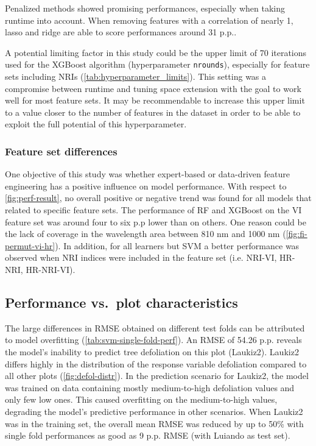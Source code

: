 \documentclass[final]{IEEEtran}
\begin{document}
Penalized methods showed promising performances, especially when taking runtime into account.
When removing features with a correlation of nearly 1, lasso and ridge are able to score performances around 31 p.p..

A potential limiting factor in this study could be the upper limit of 70 iterations used for the XGBoost algorithm (hyperparameter \texttt{nrounds}), especially for feature sets including NRIs (\autoref{tab:hyperparameter_limits}).
This setting was a compromise between runtime and tuning space extension with the goal to work well for most feature sets.
It may be recommendable to increase this upper limit to a value closer to the number of features in the dataset in order to be able to exploit the full potential of this hyperparameter.

\subsubsection{Feature set differences}

One objective of this study was whether expert-based or data-driven feature engineering has a positive influence on model performance.
With respect to \autoref{fig:perf-result}, no overall positive or negative trend was found for all models that related to specific feature sets.
The performance of RF and XGBoost on the VI feature set was around four to six p.p lower than on others.
One reason could be the lack of coverage in the wavelength area between 810 nm and 1000 nm (\autoref{fig:fi-permut-vi-hr}).
In addition, for all learners but SVM a better performance was observed when NRI indices were included in the feature set (i.e. NRI-VI, HR-NRI, HR-NRI-VI).

\subsection{Performance vs.\ plot characteristics}
\label{subsec:perf-plot-char}

The large differences in RMSE obtained on different test folds can be attributed to model overfitting (\autoref{tab:svm-single-fold-perf}).
An RMSE of 54.26 p.p. reveals the model's inability to predict tree defoliation on this plot (Laukiz2).
Laukiz2 differs highly in the distribution of the response variable defoliation compared to all other plots (\autoref{fig:defol-distr}).
In the prediction scenario for Laukiz2, the model was trained on data containing mostly medium-to-high defoliation values and only few low ones.
This caused overfitting on the medium-to-high values, degrading the model's predictive performance in other scenarios.
When Laukiz2 was in the training set, the overall mean RMSE was reduced by up to 50\% with single fold performances as good as 9 p.p. RMSE (with Luiando as test set).
\end{document}
